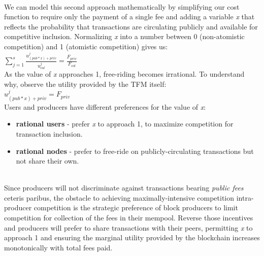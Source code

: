\documentclass[11pt,a4paper]{llncs}
\begin{document}
\vspace{0.2cm} \\
We can model this second approach mathematically by simplifying our cost function to require only the payment of a single fee and adding a variable \textit{x} that reflects the probability that transactions are circulating publicly and available for competitive inclusion. Normalizing \textit{x} into a number between 0 (non-atomistic competition) and 1 (atomistic competition) gives us:
\vspace{0.2cm} \\
\LARGE
\begin{math}
\sum_{j=1}^{s} \frac{u_{({pub}*{x})+{priv}}^j}{u_{col}^j} = \frac{F_{{priv}}}{F_{col}}
\end{math}
\normalsize
\vspace{0.2cm} \\
As the value of \textit{x} approaches 1, free-riding becomes irrational. To understand why, observe the utility provided by the TFM itself:
\vspace{0.2cm} \\
\LARGE
\begin{math}
u_{\left({pub}*{x}\right)+{priv}}^j = F_{priv}
\end{math}
\normalsize
\vspace{0.2cm} \\
Users and producers have different preferences for the value of \textit{x}:
\vspace{0.2cm} \\
\begin{itemize}
  \item \textbf{rational users} - prefer \textit{x} to approach 1, to maximize competition for transaction inclusion.
  \item \textbf{rational nodes} - prefer to free-ride on publicly-circulating transactions but not share their own.
\end{itemize}
\vspace{0.2cm} \\
Since producers will not discriminate against transactions bearing \textit{public fees} ceteris paribus, the obstacle to achieving maximally-intensive competition intra-producer competition is the strategic preference of block producers to limit competition for collection of the fees in their mempool. Reverse those incentives and producers will prefer to share transactions with their peers, permitting \textit{x} to approach 1 and ensuring the marginal utility provided by the blockchain increases monotonically with total fees paid.
\end{document}

